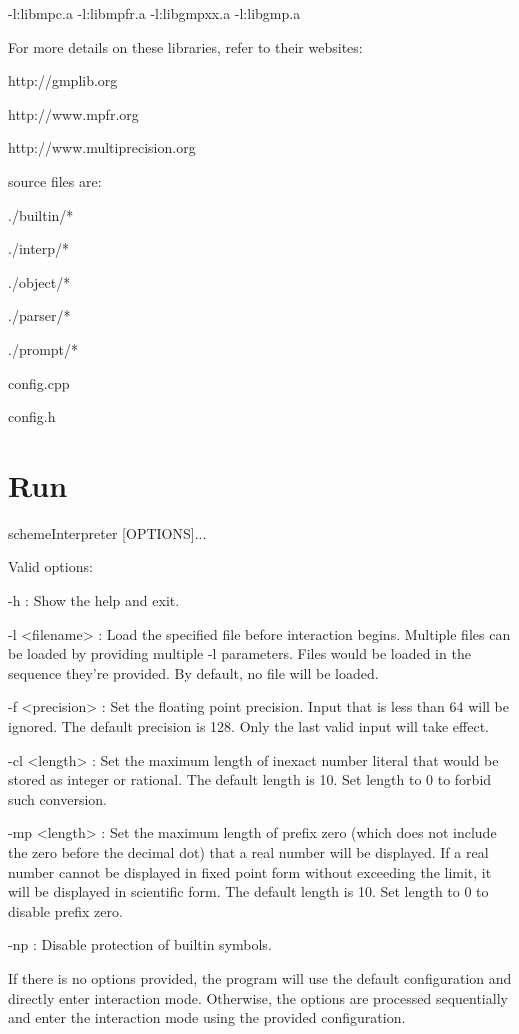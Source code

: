 \documentclass{article}
\begin{document}
	-l:libmpc.a -l:libmpfr.a -l:libgmpxx.a -l:libgmp.a

\noindent
For more details on these libraries, refer to their websites:

	http://gmplib.org

	http://www.mpfr.org

	http://www.multiprecision.org

\noindent
	source files are:
	
		./builtin/*
		
		./interp/*
	
		./object/*

		./parser/*

		./prompt/*

		config.cpp

		config.h

\section{Run}
	schemeInterpreter [OPTIONS]...

	Valid options:
	
	-h : Show the help and exit.

	-l <filename> : Load the specified file before interaction begins. Multiple files can be loaded by providing multiple -l parameters. Files would be loaded in the sequence they're provided. By default, no file will be loaded.

	-f <precision> : Set the floating point precision. Input that is less than 64 will be ignored. The default precision is 128. Only the last valid input will take effect.

	-cl <length> : Set the maximum length of inexact number literal that would be stored as integer or rational. The default length is 10. Set length to 0 to forbid such conversion.

	-mp <length> : Set the maximum length of prefix zero (which does not include the zero before the decimal dot) that a real number will be displayed. If a real number cannot be displayed in fixed point form without exceeding the limit, it will be displayed in scientific form. The default length is 10. Set length to 0 to disable prefix zero.
	
	-np : Disable protection of builtin symbols.

	
	If there is no options provided, the program will use the default configuration and directly enter
	interaction mode. Otherwise, the options are processed sequentially and enter the interaction mode
	using the provided configuration.
	
\end{document}
